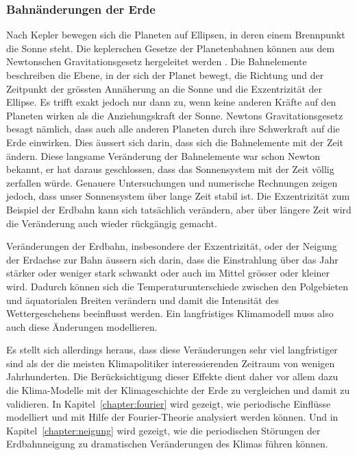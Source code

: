 \subsubsection{Bahnänderungen der Erde}
%
Nach Kepler bewegen sich die Planeten auf Ellipsen,
in deren einem Brennpunkt die Sonne steht.
Die keplerschen Gesetze der Planetenbahnen können aus dem Newtonschen 
Gravitationsgesetz hergeleitet werden
\cite[\S 6]{skript:joos}.
%
%
Die Bahnelemente beschreiben die Ebene, in der sich der Planet bewegt,
die Richtung und der Zeitpunkt der grössten Annäherung an die Sonne und
die Exzentrizität der Ellipse.
%
%
Es trifft exakt jedoch nur dann zu, wenn keine anderen Kräfte auf den
Planeten wirken als die Anziehungskraft der Sonne.
Newtons Gravitationsgesetz besagt nämlich, dass auch alle anderen
%
Planeten durch ihre Schwerkraft auf die Erde einwirken.
Dies äussert sich darin, dass sich die Bahnelemente mit der Zeit
ändern.
Diese langsame Veränderung der Bahnelemente war schon Newton bekannt,
er hat daraus geschlossen, dass das Sonnensystem mit der Zeit völlig
zerfallen würde.
Genauere Untersuchungen und numerische Rechnungen zeigen jedoch, dass
unser Sonnensystem über lange Zeit stabil ist.
Die Exzentrizität zum Beispiel der Erdbahn kann sich tatsächlich verändern,
aber über längere Zeit wird die Veränderung auch wieder rückgängig
gemacht.

Veränderungen der Erdbahn, insbesondere der Exzentrizität, oder der
Neigung der Erdachse zur Bahn äussern sich darin, dass die Einstrahlung
über das Jahr stärker oder weniger stark schwankt oder auch im Mittel
grösser oder kleiner wird.
%
Dadurch können sich die Temperaturunterschiede zwischen den Polgebieten und
äquatorialen Breiten verändern und damit die Intensität des Wettergeschehens
beeinflusst werden.
Ein langfristiges Klimamodell muss also auch diese Änderungen
modellieren.

Es stellt sich allerdings heraus, dass diese Veränderungen sehr viel
langfristiger sind als der die meisten Klimapolitiker interessierenden
Zeitraum von wenigen Jahrhunderten.
Die Berücksichtigung dieser Effekte dient daher vor allem dazu die
Klima-Modelle mit der Klimageschichte der Erde zu vergleichen und
damit zu validieren.
In Kapitel~\ref{chapter:fourier} wird gezeigt, wie periodische Einflüsse
modelliert und mit Hilfe der Fourier-Theorie analysiert werden können.
Und in Kapitel~\ref{chapter:neigung} wird gezeigt, wie die periodischen
Störungen der Erdbahnneigung zu dramatischen Veränderungen des Klimas
führen können.





